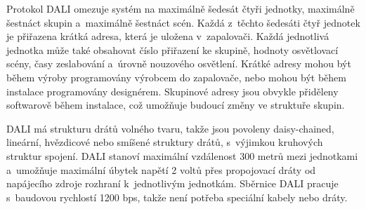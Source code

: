 Protokol DALI omezuje systém na maximálně šedesát čtyři jednotky, maximálně šestnáct skupin a~maximálně šestnáct scén.
Každá z~těchto šedesáti čtyř jednotek je přiřazena krátká adresa, která je uložena v~zapalovači.
Každá jednotlivá jednotka může také obsahovat číslo přiřazení ke skupině, hodnoty osvětlovací scény,
časy zeslabování a~úrovně nouzového osvětlení. Krátké adresy mohou být během výroby programovány výrobcem
do zapalovače, nebo mohou být během instalace programovány designérem. Skupinové adresy jsou obvykle
přiděleny softwarově během instalace, což umožňuje budoucí změny ve struktuře skupin.

DALI má strukturu drátů volného tvaru, takže jsou povoleny daisy-chained, lineární, hvězdicové nebo smíšené
struktury drátů, s~výjimkou kruhových struktur spojení. DALI stanoví maximální vzdálenost 300 metrů mezi
jednotkami a~umožňuje maximální úbytek napětí 2 voltů přes propojovací dráty od napájecího zdroje rozhraní
k~jednotlivým jednotkám. Sběrnice DALI pracuje s~baudovou rychlostí 1200 bps, takže není potřeba speciální
kabely nebo dráty.

